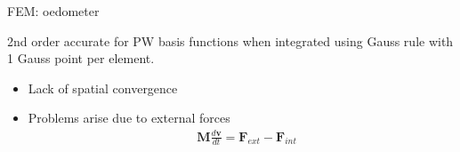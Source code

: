 \documentclass[mathserif,professionalfont,hyperref={pdfpagelabels=false}]{beamer}
\begin{document}

% 
% 
\begin{frame}{FEM: oedometer}
	\begin{tcolorbox}[colback=red!5,colframe=red!50!black,title=Theoretical order of accuracy]
	2nd order accurate for PW basis functions when integrated using Gauss rule with 1 Gauss point per element\footnotemark.
	\end{tcolorbox}
	\pause
	\begin{tcolorbox}[colback=blue!5,colframe=blue!40!black,title=Observations]
	\begin{itemize}
	 \item Lack of spatial convergence
	 \item Problems arise due to external forces\\
	 \begin{align}\nonumber
	 & \mathbf{M}\frac{d \mathbf{v}}{dt} = \mathbf{F}_{ext}-\mathbf{F}_{int}\\ \nonumber
	 \end{align}
	\end{itemize}

	\end{tcolorbox}
\end{frame}
\end{document}
